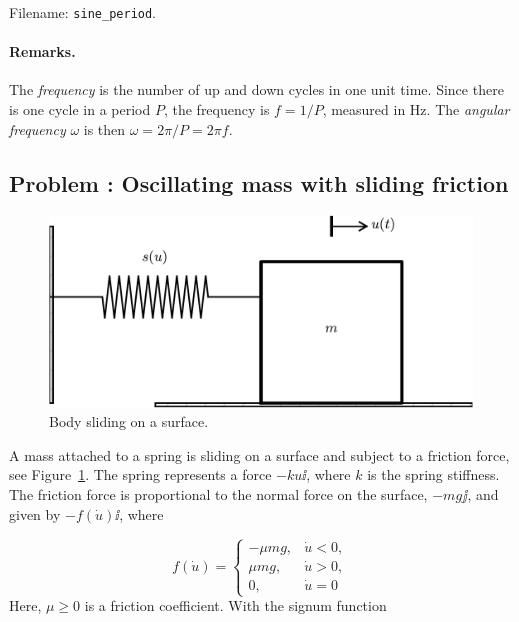 \documentclass[graybox,envcountchap,sectrefs,final]{svmonodo}
\newcounter{doconce:movie:counter}
\newenvironment{doconceexercise}{}{}
\newcounter{doconceexercisecounter}
\begin{document}
\begin{doconceexercise}
\noindent Filename: \Verb!sine_period!.


\paragraph{Remarks.}
The \emph{frequency} is the number of up and down cycles in one unit time.
Since there is one cycle in a period $P$, the frequency is $f =1/P$,
measured in Hz.
The \emph{angular frequency} $\omega$ is then $\omega = 2\pi/P = 2\pi f$.


\end{doconceexercise}




\begin{doconceexercise}

\subsection*{Problem \thedoconceexercisecounter: Oscillating mass with sliding friction}

\label{scale:vib:exer:sliding}


\begin{figure}[!ht]  %
  \centerline{\includegraphics[width=0.7\linewidth]{fig-scaling/oscillator_sliding.pdf}}
  \caption{
  Body sliding on a surface. \label{scale:vib:exer:sliding:fig}
  }
\end{figure}


A mass attached to a spring is sliding on a surface and subject to
a friction force, see Figure~\ref{scale:vib:exer:sliding:fig}.
The spring represents a force $-ku\ii$, where $k$ is the spring stiffness.
The friction force is proportional to the normal force on the surface,
$-mg\jj$, and given by $-f(\dot u)\ii$, where

\[ f(\dot u) = \left\lbrace\begin{array}{ll}
-\mu mg,& \dot u < 0,\\ 
\mu mg, & \dot u > 0,\\ 
0,      & \dot u=0
\end{array}\right.\]
Here, $\mu \geq 0$ is a friction coefficient. With the signum function


\end{doconceexercise}
\end{document}
